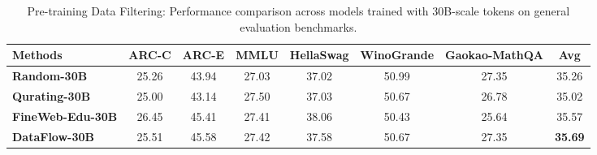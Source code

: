 \begin{table}[t]
\centering
\small
\caption{Pre-training Data Filtering: Performance comparison across models trained with 30B-scale tokens on general evaluation benchmarks.}
\label{tab:PT}
\begin{tabular}{lccccccc}
\toprule
\textbf{Methods} & \textbf{ARC-C} & \textbf{ARC-E} & \textbf{MMLU} & \textbf{HellaSwag} & \textbf{WinoGrande} & \textbf{Gaokao-MathQA} & \textbf{Avg} \\
\midrule
\textbf{Random-30B}      & 25.26 & 43.94 & 27.03 & 37.02 & 50.99 & 27.35 & 35.26 \\
\textbf{Qurating-30B}    & 25.00 & 43.14 & 27.50 & 37.03 & 50.67 & 26.78 & 35.02 \\
\textbf{FineWeb-Edu-30B}  & 26.45 & 45.41 & 27.41 & 38.06 & 50.43 & 25.64 & 35.57 \\
\textbf{DataFlow-30B}    & 25.51 & 45.58 & 27.42 & 37.58 & 50.67 & 27.35 & \textbf{35.69} \\
\bottomrule
\end{tabular}
\end{table}
